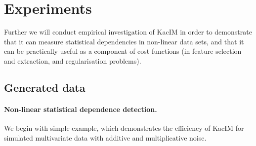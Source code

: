 \documentclass{article}
\begin{document}
\section{Experiments}
\label{section:experiments}

Further we will conduct empirical investigation of KacIM in order to demonstrate that it can measure statistical dependencies in non-linear data sets, and that it can be practically useful as a component of cost functions (in feature selection and extraction, and regularisation problems).

\subsection{Generated data}

\paragraph{Non-linear statistical dependence detection.} We begin with simple example, which demonstrates the efficiency of KacIM for simulated multivariate data with additive and multiplicative noise.
\end{document}
